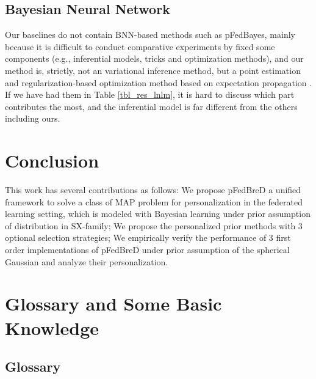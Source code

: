 \documentclass{article}
\begin{document}
\subsection{Bayesian Neural Network}

Our baselines do not contain BNN-based methods such as pFedBayes, mainly because it is difficult to conduct comparative experiments by fixed some components (e.g., inferential models, tricks and optimization methods), and our method is, strictly, not an variational inference method, but a point estimation and regularization-based optimization method based on expectation propagation \cite{Minka2001ExpectationPF,Seeger2009ExpectationPF}. If we have had them in Table \ref{tbl_res_lnlm}, it is hard to discuss which part contributes the most, and the inferential model is far different from the others including ours.

\section{Conclusion}
\label{sec_cncls}

This work has several contributions as follows: We propose pFedBreD a unified framework to solve a class of MAP problem for personalization in the federated learning setting, which is modeled with Bayesian learning under prior assumption of distribution in SX-family; 
We propose the personalized prior methods with 3 optional selection strategies;
We empirically verify the performance of 3 first order implementations of pFedBreD under prior assumption of the spherical Gaussian and analyze their personalization.








  




\appendix
\setcounter{equation}{0}
\setcounter{figure}{0}
\setcounter{table}{0}

\newpage
\newpage


\section{Glossary and Some Basic Knowledge}

\subsection{Glossary}
\end{document}
